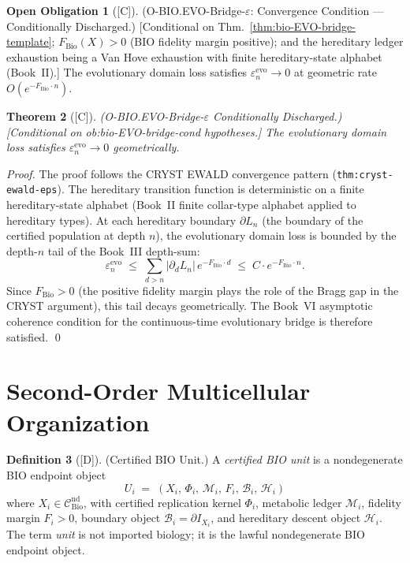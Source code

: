 \documentclass[12pt,oneside]{amsbook}
\theoremstyle{plain}
\newtheorem{theorem}{Theorem}[section]
\theoremstyle{definition}
\newtheorem{definition}[theorem]{Definition}
\newtheorem{obligation}[theorem]{Open Obligation}
\theoremstyle{remark}
\newcommand{\status}[1]{\textup{[#1]}}
\begin{document}
\begin{obligation}[\status{C}]\label{ob:bio-EVO-bridge-cond}
\textup{(O-BIO.EVO-Bridge-$\varepsilon$: Convergence Condition ---
Conditionally Discharged.)}
\textup{[Conditional on Thm.~\ref{thm:bio-EVO-bridge-template};
$F_{\mathrm{Bio}}(X) > 0$ (BIO fidelity margin positive);
and the hereditary ledger exhaustion being a Van Hove exhaustion
with finite hereditary-state alphabet (Book~II).]}
The evolutionary domain loss satisfies
$\varepsilon_n^{\mathrm{evo}} \to 0$ at geometric rate
$O(e^{-F_{\mathrm{Bio}} \cdot n})$.
\end{obligation}

\begin{theorem}[\status{C}]\label{thm:bio-EVO-eps-discharged}
\textup{(O-BIO.EVO-Bridge-$\varepsilon$ Conditionally Discharged.)}
\textup{[Conditional on ob:bio-EVO-bridge-cond hypotheses.]}
The evolutionary domain loss satisfies
$\varepsilon_n^{\mathrm{evo}} \to 0$ geometrically.
\end{theorem}

\begin{proof}
The proof follows the CRYST EWALD convergence pattern
(\texttt{thm:cryst-ewald-eps}).  The hereditary transition
function is deterministic on a finite hereditary-state alphabet
(Book~II finite collar-type alphabet applied to hereditary types).
At each hereditary boundary $\partial L_n$ (the boundary of the
certified population at depth $n$), the evolutionary domain loss
is bounded by the depth-$n$ tail of the Book~III depth-sum:
\[
  \varepsilon_n^{\mathrm{evo}}
  \;\le\;
  \sum_{d > n} |\partial_d L_n|\, e^{-F_{\mathrm{Bio}} \cdot d}
  \;\le\;
  C \cdot e^{-F_{\mathrm{Bio}} \cdot n}.
\]
Since $F_{\mathrm{Bio}} > 0$ (the positive fidelity margin plays
the role of the Bragg gap in the CRYST argument), this tail decays
geometrically.  The Book~VI asymptotic coherence condition for the
continuous-time evolutionary bridge is therefore satisfied.
\qed
\end{proof}

\section{Second-Order Multicellular Organization}\label{sec:bio-MULTI-discharge}

\begin{definition}[\status{D}]\label{def:bio-unit}
\textup{(Certified BIO Unit.)}
A \emph{certified BIO unit} is a nondegenerate BIO endpoint object
\[
 U_i \;=\; (X_i,\, \Phi_i,\, \mathcal{M}_i,\, F_i,\, \mathcal{B}_i,\, \mathcal{H}_i)
\]
where $X_i \in \mathcal{C}_{\mathrm{Bio}}^{\mathrm{nd}}$, with
certified replication kernel $\Phi_i$, metabolic ledger $\mathcal{M}_i$,
fidelity margin $F_i > 0$, boundary object
$\mathcal{B}_i = \partial I_{X_i}$, and hereditary descent object
$\mathcal{H}_i$. The term \emph{unit} is not imported biology;
it is the lawful nondegenerate BIO endpoint object.
\end{definition}
\end{document}
